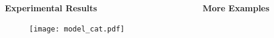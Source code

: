 \documentclass{beamer}
\renewcommand{\*}[1]{\textbf{#1}}
\begin{document}
\begin{frame}{}
\begin{columns}[T]
\begin{column}{0.32\linewidth}
\begin{block}{\bf{\large Experimental Results}}
\begin{table}[t!]
\begin{center}
\end{center}
\end{table}
\vskip 0.4in
\vfill

\begin{figure}
\texttt{[image: model\_cat.pdf]}
\end{figure}




\end{block}
\vfill

\endminipage
\end{column}

\begin{column}{0.32\linewidth}
\minipage[t][0.9\textheight][s]{\columnwidth}

\begin{block}{\bf{\large More Examples}}


\end{block}
\end{column}
\end{columns}
\end{frame}
\end{document}
